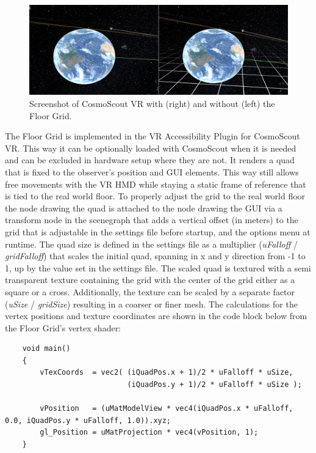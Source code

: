 \begin{figure}[h]
    \centering
    \includegraphics[width=\textwidth]{content/4_1_floorGrid/img/FloorGrid_Screenshot}
    \caption{Screenshot of CosmoScout VR with (right) and without (left) the Floor Grid.}
    \label{fig:floor-grid-screenshot}
\end{figure}
The Floor Grid is implemented in the VR Accessibility Plugin for CosmoScout VR\@.
This way it can be optionally loaded with CosmoScout when it is needed and can be excluded in hardware setup where
they are not.
It renders a quad that is fixed to the observer's position and GUI elements.
This way still allows free movements with the VR HMD while staying a static frame of reference that is tied to
the real world floor.
To properly adjust the grid to the real world floor the node drawing the quad is attached to the node drawing the GUI
via a transform node in the scenegraph that adds a vertical offset (in meters) to the grid that is adjustable in the
settings file before startup, and the options menu at runtime.
The quad size is defined in the settings file as a multiplier (\textit{uFalloff} / \textit{gridFalloff}) that scales
the initial quad, spanning in x and y direction from -1 to 1, up by the value set in the settings file.
The scaled quad is textured with a semi transparent texture containing the grid with the center of the grid either as a
square or a cross.
Additionally, the texture can be scaled by a separate factor (\textit{uSize} / \textit{gridSize}) resulting in a
coarser or finer mesh.
The calculations for the vertex positions and texture coordinates are shown in the code block below from the Floor
Grid's vertex shader:
\begin{verbatim}
    void main()
    {
        vTexCoords  = vec2( (iQuadPos.x + 1)/2 * uFalloff * uSize,
                            (iQuadPos.y + 1)/2 * uFalloff * uSize );

        vPosition   = (uMatModelView * vec4(iQuadPos.x * uFalloff, 0.0, iQuadPos.y * uFalloff, 1.0)).xyz;
        gl_Position = uMatProjection * vec4(vPosition, 1);
    }
\end{verbatim}
